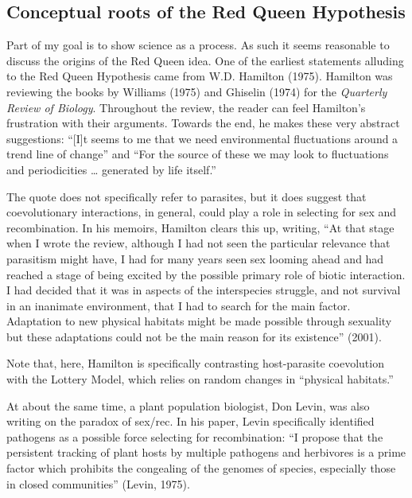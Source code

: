\documentclass[
  letterpaper,
]{book}
\begin{document}
\hypertarget{conceptual-roots-of-the-red-queen-hypothesis}{%
\subsection{Conceptual roots of the Red Queen
Hypothesis}\label{conceptual-roots-of-the-red-queen-hypothesis}}

Part of my goal is to show science as a process. As such it seems
reasonable to discuss the origins of the Red Queen idea. One of the
earliest statements alluding to the Red Queen Hypothesis came from W.D.
Hamilton (1975). Hamilton was reviewing the books by Williams (1975) and
Ghiselin (1974) for the \emph{Quarterly Review of Biology}. Throughout
the review, the reader can feel Hamilton's frustration with their
arguments. Towards the end, he makes these very abstract suggestions:
``{[}I{]}t seems to me that we need environmental fluctuations around a
trend line of change'' and ``For the source of these we may look to
fluctuations and periodicities \ldots{} generated by life itself.''

The quote does not specifically refer to parasites, but it does suggest
that coevolutionary interactions, in general, could play a role in
selecting for sex and recombination. In his memoirs, Hamilton clears
this up, writing, ``At that stage when I wrote the review, although I
had not seen the particular relevance that parasitism might have, I had
for many years seen sex looming ahead and had reached a stage of being
excited by the possible primary role of biotic interaction. I had
decided that it was in aspects of the interspecies struggle, and not
survival in an inanimate environment, that I had to search for the main
factor. Adaptation to new physical habitats might be made possible
through sexuality but these adaptations could not be the main reason for
its existence'' (2001).

Note that, here, Hamilton is specifically contrasting host-parasite
coevolution with the Lottery Model, which relies on random changes in
``physical habitats.''

At about the same time, a plant population biologist, Don Levin, was
also writing on the paradox of sex/rec. In his paper, Levin specifically
identified pathogens as a possible force selecting for recombination:
``I propose that the persistent tracking of plant hosts by multiple
pathogens and herbivores is a prime factor which prohibits the
congealing of the genomes of species, especially those in closed
communities'' (Levin, 1975).
\end{document}
